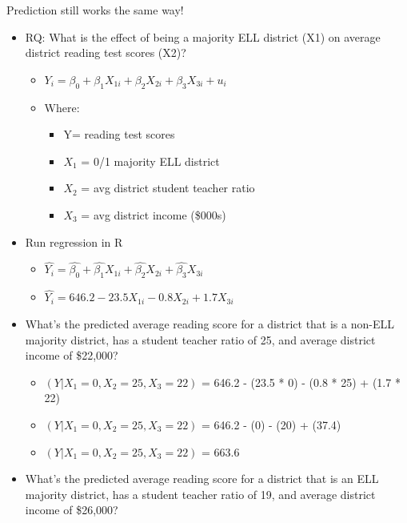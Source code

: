 \documentclass[
  8pt,
  ignorenonframetext,
  dvipsnames]{beamer}
\providecommand{\tightlist}{%
  \setlength{\itemsep}{0pt}\setlength{\parskip}{0pt}}
\let\olditem\item
\renewcommand{\item}{%
  \olditem\vspace{4pt}
}
\begin{document}
\begin{frame}{Prediction still works the same way!}
\protect\hypertarget{prediction-still-works-the-same-way}{}

\begin{itemize}
\tightlist
\item
  RQ: What is the effect of being a majority ELL district (X1) on
  average district reading test scores (X2)?

  \begin{itemize}
  \tightlist
  \item
    \(Y_i = \beta_0 + \beta_1X_{1i} + \beta_2X_{2i} + \beta_3X_{3i} + u_i\)
  \item
    Where:

    \begin{itemize}
    \tightlist
    \item
      Y= reading test scores
    \item
      \(X_1\) = 0/1 majority ELL district
    \item
      \(X_2\) = avg district student teacher ratio
    \item
      \(X_3\) = avg district income (\$000s)
    \end{itemize}
  \end{itemize}
\item
  Run regression in R

  \begin{itemize}
  \tightlist
  \item
    \(\hat{Y_i} = \hat{\beta_0} + \hat{\beta_1} X_{1i} + \hat{\beta_2} X_{2i} + \hat{\beta_3} X_{3i}\)
  \item
    \(\hat{Y_i} = 646.2 - 23.5 X_{1i} -0.8 X_{2i} + 1.7 X_{3i}\)
  \end{itemize}
\item
  What's the predicted average reading score for a district that is a
  non-ELL majority district, has a student teacher ratio of 25, and
  average district income of \$22,000?

  \begin{itemize}
  \tightlist
  \item
    \((Y| X_1=0, X_2=25, X_3=22)\) = 646.2 - (23.5 * 0) - (0.8 * 25) +
    (1.7 * 22)
  \item
    \((Y| X_1=0, X_2=25, X_3=22)\) = 646.2 - (0) - (20) + (37.4)
  \item
    \((Y| X_1=0, X_2=25, X_3=22)\) = 663.6
  \end{itemize}
\item
  What's the predicted average reading score for a district that is an
  ELL majority district, has a student teacher ratio of 19, and average
  district income of \$26,000?


\end{itemize}
\end{frame}
\end{document}
